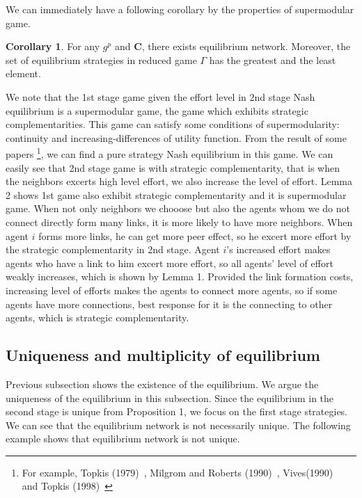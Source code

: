 \documentclass[12pt]{article}
\theoremstyle{definition}
\newtheorem{corollary}{Corollary}
\newcommand{\bm}[1]{\boldsymbol{#1}}
\begin{document}
We can immediately have a following corollary by the properties of supermodular game.

\begin{corollary}
	For any $g^p$ and $\bm{C}$, there exists equilibrium network.
	Moreover, the set of equilibrium strategies in reduced game $\Gamma$ has the greatest and the least element.
\end{corollary}

We note that the 1st stage game given the effort level in 2nd stage Nash equilibrium is a supermodular game, the game which exhibits strategic complementarities.
This game can satisfy some conditions of supermodularity: continuity and increasing-differences of utility function.
From the result of some papers \footnote{For example, Topkis (1979)~\cite{topkis1979}, Milgrom and Roberts (1990)~\cite{milgromroberts}, Vives(1990)~\cite{vives} and Topkis (1998)~\cite{topkis1998}}, we can find a pure strategy Nash equilibrium in this game.
We can easily see that 2nd stage game is with strategic complementarity, that is when the neighbors excerts high level effort, we also increase the level of effort.
Lemma 2 shows 1st game also exhibit strategic complementarity and it is supermodular game.
When not only neighbors we chooose but also the agents whom we do not connect directly form many links, it is more likely to have more neighbors.
When agent $i$ forms more links, he can get more peer effect, so he excert more effort by the strategic complementarity in 2nd stage.
Agent $i$'s increased effort makes agents who have a link to him excert more effort, so all agents' level of effort weakly increases, which is shown by Lemma 1.
Provided the link formation costs, increasing level of efforts makes the agents to connect more agents, so if some agents have more connections, best response for it is the connecting to other agents, which is strategic complementarity.


\subsection{Uniqueness and multiplicity of equilibrium}

Previous subsection shows the existence of the equilibrium.
We argue the uniqueness of the equilibrium in this subsection.
Since the equilibrium in the second stage is unique from Proposition 1, we focus on the first stage strategies.
We can see that the equilibrium network is not necessarily unique.
The following example shows that equilibrium network is not unique.
\end{document}
